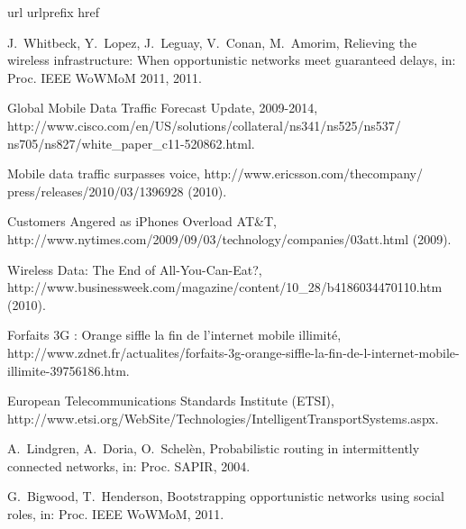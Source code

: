 \documentclass[preprint]{elsarticle}
\begin{document}

\begin{thebibliography}{10}
\expandafter\ifx\csname url\endcsname\relax
  \def\url#1{\texttt{#1}}\fi
\expandafter\ifx\csname urlprefix\endcsname\relax\def\urlprefix{URL }\fi
\expandafter\ifx\csname href\endcsname\relax
  \def\href#1#2{#2} \def\path#1{#1}\fi

J.~Whitbeck, Y.~Lopez, J.~Leguay, V.~Conan, M.~Amorim, Relieving the wireless
  infrastructure: When opportunistic networks meet guaranteed delays, in: Proc.
  {IEEE WoWMoM} 2011, 2011.

{Global Mobile Data Traffic Forecast Update, 2009-2014},
  \href{http://www.cisco.com/en/US/solutions/collateral/ns341/ns525/ns537/ns705/ns827/white\_paper\_c11-520862.html}{http://www.cisco.com/en/US/solutions/collateral/ns341/ns525/ns537/ ns705/ns827/white\_paper\_c11-520862.html}.

Mobile data traffic surpasses voice,
  \href{http://www.ericsson.com/thecompany/press/releases/2010/03/1396928}{http://www.ericsson.com/thecompany/ press/releases/2010/03/1396928} (2010).

{Customers Angered as iPhones Overload AT\&T},
  \href{http://www.nytimes.com/2009/09/03/technology/companies/03att.html}{http://www.nytimes.com/2009/09/03/technology/companies/03att.html} (2009).

{Wireless Data: The End of All-You-Can-Eat?},
  \href{http://www.businessweek.com/magazine/content/10\_28/b4186034470110.htm}{http://www.businessweek.com/magazine/content/10\_28/b4186034470110.htm}
  (2010).

{Forfaits 3G : Orange siffle la fin de l'internet mobile illimit\'e},
  \href{http://www.zdnet.fr/actualites/forfaits-3g-orange-siffle-la-fin-de-l-internet-mobile-illimite-39756186.htm}{http://www.zdnet.fr/actualites/forfaits-3g-orange-siffle-la-fin-de-l-internet-mobile-illimite-39756186.htm}.

{European Telecommunications Standards Institute (ETSI)},
  \href{http://www.etsi.org/WebSite/Technologies/IntelligentTransportSystems.aspx}{http://www.etsi.org/WebSite/Technologies/IntelligentTransportSystems.aspx}.

A.~Lindgren, A.~Doria, O.~Schel{\`e}n, Probabilistic routing in intermittently
  connected networks, in: Proc. {SAPIR}, 2004.

G.~Bigwood, T.~Henderson, Bootstrapping opportunistic networks using social
  roles, in: Proc. {IEEE WoWMoM}, 2011.


\end{thebibliography}
\end{document}
